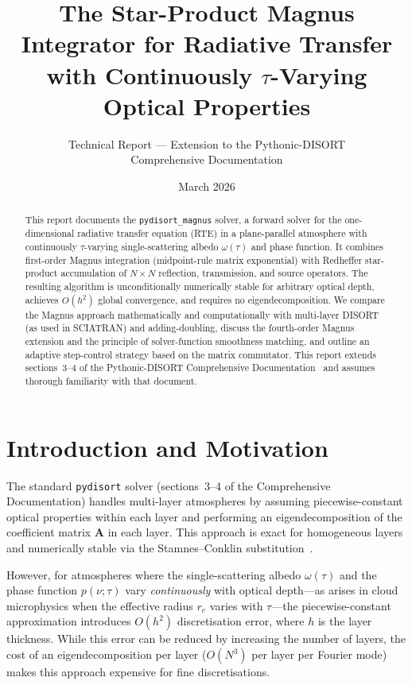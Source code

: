\documentclass[11pt,a4paper]{article}
\title{The Star-Product Magnus Integrator for Radiative Transfer\\
with Continuously $\tau$-Varying Optical Properties}
\author{Technical Report --- Extension to the Pythonic-DISORT\\
Comprehensive Documentation}
\date{March 2026}
\newcommand{\mat}[1]{\mathbf{#1}}
\theoremstyle{definition}
\begin{document}
\maketitle

\begin{abstract}
This report documents the \texttt{pydisort\_magnus} solver, a forward
solver for the one-dimensional radiative transfer equation (RTE) in a
plane-parallel atmosphere with continuously $\tau$-varying
single-scattering albedo $\omega(\tau)$ and phase function.
It combines first-order Magnus integration (midpoint-rule matrix
exponential) with Redheffer star-product accumulation of
$N\!\times\!N$ reflection, transmission, and source operators.
The resulting algorithm is unconditionally numerically stable for
arbitrary optical depth, achieves $O(h^2)$ global convergence, and
requires no eigendecomposition.  We compare the Magnus approach
mathematically and computationally with multi-layer DISORT (as used
in SCIATRAN) and adding-doubling, discuss the fourth-order Magnus
extension and the principle of solver-function smoothness matching,
and outline an adaptive step-control strategy based on the matrix
commutator.  This report extends sections~3--4 of the Pythonic-DISORT
Comprehensive Documentation~\cite{HP2024doc} and assumes thorough
familiarity with that document.
\end{abstract}

\tableofcontents
\vspace{1em}

\section{Introduction and Motivation}\label{sec:intro}

The standard \texttt{pydisort} solver (sections~3--4 of the
Comprehensive Documentation) handles multi-layer atmospheres by
assuming piecewise-constant optical properties within each layer and
performing an eigendecomposition of the coefficient matrix
$\mat{A}$ in each layer.  This approach is exact for homogeneous
layers and numerically stable via the Stamnes--Conklin
substitution~\cite{stamnes1984}.

However, for atmospheres where the single-scattering albedo
$\omega(\tau)$ and the phase function $p(\nu;\tau)$ vary
\emph{continuously} with optical depth---as arises in cloud
microphysics when the effective radius $r_e$ varies with $\tau$---the
piecewise-constant approximation introduces $O(h^2)$ discretisation
error, where $h$ is the layer thickness.  While this error can be
reduced by increasing the number of layers, the cost of an
eigendecomposition per layer ($O(N^3)$ per layer per Fourier mode)
makes this approach expensive for fine discretisations.
\end{document}
